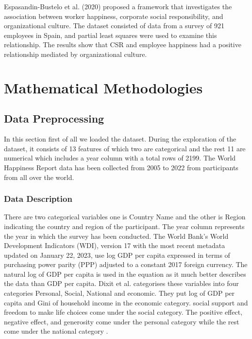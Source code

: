 \documentclass[12pt, a4paper, twoside]{report}
\theoremstyle{plain} %
\theoremstyle{definition} %
\theoremstyle{remark} %
\numberwithin{equation}{chapter}
\begin{document}
Espasandin-Bustelo et al. (2020) \cite{espasandin2021employee} proposed a framework that investigates the association between worker happiness, corporate social responsibility, and organizational culture. The dataset consisted of data from a survey of 921 employees in Spain, and partial least squares were used to examine this relationship. The results show that CSR and employee happiness had a positive relationship mediated by organizational culture.\\








\chapter{Mathematical Methodologies}\label{ch:3}

\section{Data Preprocessing}
 In this section first of all we loaded the dataset. During the exploration of the dataset, it consists of 13 features of which two are categorical and the rest 11 are numerical which includes a year column with a total rows of 2199. The World Happiness Report data has been collected from 2005 to 2022 from participants from all over the world.
 
\subsection{Data Description}
There are two categorical variables one is Country Name and the other is Region indicating the country and region of the participant. The year column represents the year in which the survey has been conducted. The World Bank's World Development Indicators (WDI), version 17 with the most recent metadata updated on January 22, 2023, use log GDP per capita expressed in terms of purchasing power parity (PPP) adjusted to a constant 2017 foreign currency. The natural log of GDP per capita is used in the equation as it much better describes the data than GDP per capita. Dixit et al.  categorises these variables into four categories Personal, Social, National and economic. They put log of GDP per capita and Gini of household income in the economic category. social support and freedom to make life choices come under the social category. The positive effect, negative effect, and generosity come under the personal category while the rest come under the national category \cite{dixit2020network}.
\end{document}
